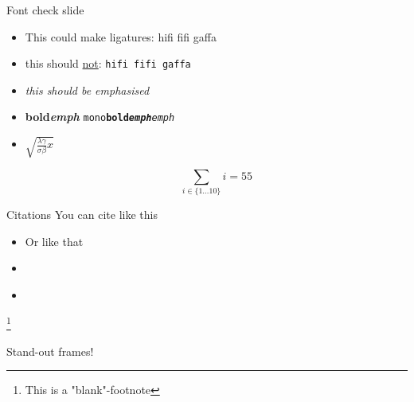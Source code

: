 \documentclass[aspectratio=169]{beamer}
\newcommand\blfootnote[1]{%
  \begingroup
  \renewcommand\thefootnote{}\footnote{#1}%
  \addtocounter{footnote}{-1}%
  \endgroup
}
\begin{document}
\begin{frame}{Font check slide}
\begin{itemize}
\item This could make ligatures: hifi fifi gaffa
\item this should \underline{not}: \texttt{hifi fifi gaffa}
\item \emph{this should be emphasised}
\item \textbf{bold\emph{emph}} \texttt{mono\textbf{bold\emph{emph}}\emph{emph}}
\item \(\sqrt{\frac{\lambda\gamma}{\sigma\beta}x}\)

\[ \sum_{i\in\{1\dots 10\}} i = 55 \]
\end{itemize}
\end{frame}

\begin{frame}{Citations}
You can cite \citep{Burt1983TheLP} like this
\begin{itemize}
    \item Or like that
    \item \cite{Ma2018InfraredAV}
    \item \citet{Burt1983TheLP}
\end{itemize}
\blfootnote{This is a "blank"-footnote}
\end{frame}

\begin{frame}[standout]
Stand-out frames!
\vfill
{}
\end{frame}
\end{document}
